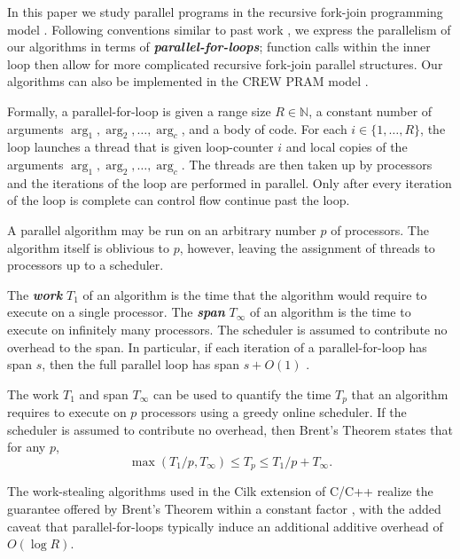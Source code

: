 \documentclass[a4paper,UKenglish,cleveref, autoref, thm-restate]{lipics-v2019}
\newcommand{\defn}[1]{{\textit{\textbf{\boldmath #1}}}}
\renewcommand{\paragraph}[1]{\vspace{0.09in}\noindent{\bf \boldmath #1.}}
\begin{document}
\paragraph{Fork-Join Parallelism} In this paper we study parallel programs
in the recursive fork-join programming model \cite{BlumofeLe99,
  FrigoLeRa98, AroraBlPl98, BlumofeJo96, CLRS, FengLe99, Cilkmem,
  ForkJoin1, Forkjoin2}. Following conventions similar to past work
\cite{Blelloch96,AcarBl16,CLRS}, we express the parallelism of our
algorithms in terms of \defn{parallel-for-loops}; function calls
within the inner loop then allow for more complicated recursive
fork-join parallel structures. Our algorithms can also be implemented
in the CREW PRAM model \cite{Blelloch96, AcarBl16}.

Formally, a parallel-for-loop is given a range size $R \in \mathbb{N}$, a
constant number of arguments $\arg_1, \arg_2, \ldots, \arg_c$, and a
body of code. For each $i \in \{1, \ldots, R\}$, the loop launches a
thread that is given loop-counter $i$ and local copies of the
arguments $\arg_1, \arg_2, \ldots, \arg_c$. The threads are then taken up by
processors and the iterations of the loop are performed in parallel. Only after
every iteration of the loop is complete can control flow continue past the
loop.

A parallel algorithm may be run on an arbitrary number $p$ of
processors. The algorithm itself is oblivious to $p$, however, leaving
the assignment of threads to processors up to a scheduler.

The \defn{work} $T_1$ of an algorithm is the time that the algorithm
would require to execute on a single processor. The \defn{span}
$T_\infty$ of an algorithm is the time to execute on infinitely many
processors. The scheduler is assumed to contribute no overhead to the
span. In particular, if each iteration of a
parallel-for-loop has span $s$, then the full parallel loop has span
$s + O(1)$ \cite{Blelloch96,AcarBl16}.

The work $T_1$ and span $T_\infty$ can be used to quantify the time $T_p$
that an algorithm requires to execute on $p$ processors using a greedy
online scheduler. If the scheduler is assumed to contribute no
overhead, then Brent's Theorem \cite{Brent74} states that for any
$p$,
$$\max(T_1 / p, T_\infty) \le T_p \le T_1 / p + T_\infty.$$

The work-stealing algorithms used in the Cilk extension of C/C++
realize the guarantee offered by Brent's Theorem within a
constant factor \cite{BlumofeJo96,BlumofeLe99}, with the added
caveat that parallel-for-loops typically induce an additional
additive overhead of $O(\log R)$. 
\end{document}
